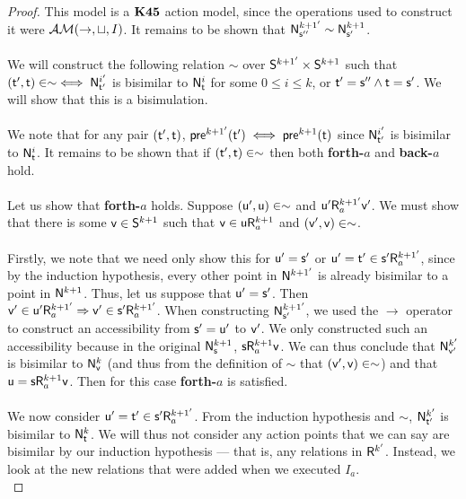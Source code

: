 \begin{proof}
  This model is a $\AXKFF$ action model, since the operations used to construct
  it were $\EM(\to,\sqcup,I)$.
  It remains to be shown that $\evM^{k+1'}_{\evs''} \sim \evM^{k+1}_{\evs'}$.\\
  \\
  We will construct the following relation $\sim$ over $\evS^{k+1'} \times
  \evS^{k+1}$ such that $(\evt',\evt) \in \sim \iff \evM^{i'}_{\evt'}$ is bisimilar to
	$\evM^{i}_{\evt}$ for some $0 \leq i \leq k$, or $\evt' = \evs'' \land \evt =
  \evs'$.
  We will show that this is a bisimulation.\\
  \\
  We note that for any pair $(\evt',\evt)$, $\evpr^{k+1'}(\evt') \iff
  \evpr^{k+1}(\evt)$ since $\evM^{i'}_{\evt'}$ is bisimilar to $\evM^{i}_{\evt}$.
  It remains to be shown that if $(\evt', \evt) \in \sim$ then both {\bf
  forth-$a$} and {\bf back-$a$} hold.\\
	\\
	Let us show that {\bf forth-$a$} holds.
	Suppose $(\evu',\evu) \in \sim$ and $\evu' \evR^{k+1'}_a \evv'$.
	We must show that there is some $\evv \in \evS^{k+1}$ such that $\evv \in \evu \evR^{k+1}_a$ and
	$(\evv',\evv) \in \sim$.\\
	\\
	Firstly, we note that we need only show this for $\evu' = \evs'$ or $\evu' = \evt' \in \evs'
	\evR^{k+1'}_a$, since by
	the induction hypothesis, every other point in $\evM^{k+1'}$ is already bisimilar to a point in
	$\evM^{k+1}$.
	Thus, let us suppose that $\evu' = \evs'$.
	Then $\evv' \in \evu' \evR^{k+1'}_a \Rightarrow \evv' \in \evs' \evR^{k+1'}_a$.
	When constructing $\evM^{k+1'}_{\evs'}$, we used the $\to$ operator to construct an accessibility
	from $\evs' = \evu'$ to $\evv'$.
	We only constructed such an accessibility because in the original $\evM^{k+1}_\evs$, $\evs
	\evR^{k+1}_a \evv$.
	We can thus conclude that $\evM^{k'}_{\evv'}$ is bisimilar to $\evM^k_\evv$ (and thus from the
	definition of $\sim$ that $(\evv',\evv) \in \sim$) and that $\evu = \evs \evR^{k+1}_a \evv$.
	Then for this case {\bf forth-$a$} is satisfied.\\
	\\
	We now consider $\evu' = \evt' \in \evs' \evR^{k+1'}_a$.
	From the induction hypothesis and $\sim$, $\evM^{k'}_{\evt'}$ is bisimilar to $\evM^{k}_{\evt}$.
	We will thus not consider any action points that we can say are bisimilar by our induction
	hypothesis --- that is, any relations in $\evR^{k'}$.
	Instead, we look at the new relations that were added when we executed $I_a$.\\

\end{proof}
